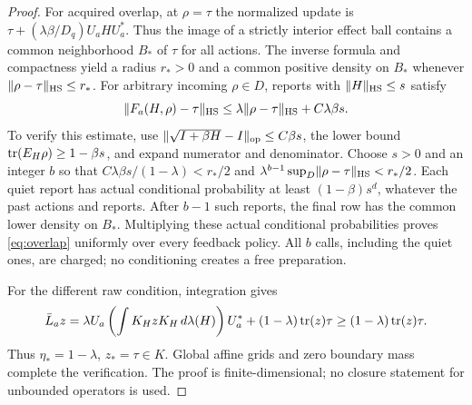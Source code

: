 \begin{proof}
For acquired overlap, at $\rho=\tau$ the normalized update is
$\tau+(\lambda\beta/D_q)U_aHU_a^*$. Thus the image of a strictly interior effect ball contains a common neighborhood $B_*$ of $\tau$ for all actions. The inverse formula and compactness yield a radius $r_*>0$ and a common positive density on $B_*$ whenever $\lVert\rho-\tau\rVert_{\mathrm{HS}}\le r_*$. For arbitrary incoming $\rho\in D$, reports with $\lVert H\rVert_{\mathrm{HS}}\le s$ satisfy
\[
 \lVert F_a(H,\rho)-\tau\rVert_{\mathrm{HS}}
 \le\lambda\lVert\rho-\tau\rVert_{\mathrm{HS}}+C\lambda\beta s.
\]
To verify this estimate, use $\lVert\sqrt{I+\beta H}-I\rVert_{\rm op}\le C\beta s$, the lower bound $\operatorname{tr}(E_H\rho)\ge1-\beta s$, and expand numerator and denominator. Choose $s>0$ and an integer $b$ so that $C\lambda\beta s/(1-\lambda)<r_*/2$ and $\lambda^{b-1}\sup_D\lVert\rho-\tau\rVert_{\mathrm{HS}}<r_*/2$. Each quiet report has actual conditional probability at least $(1-\beta)s^d$, whatever the past actions and reports. After $b-1$ such reports, the final row has the common lower density on $B_*$. Multiplying these actual conditional probabilities proves \eqref{eq:overlap} uniformly over every feedback policy. All $b$ calls, including the quiet ones, are charged; no conditioning creates a free preparation.

For the different raw condition, integration gives
\[
 \bar L_a z=\lambda U_a\left(\int K_H zK_H\,d\lambda(H)\right)U_a^*
              +(1-\lambda)\operatorname{tr}(z)\tau
 \ge (1-\lambda)\operatorname{tr}(z)\tau.
\]
Thus $\eta_*=1-\lambda$, $z_*=\tau\in K$. Global affine grids and zero boundary mass complete the verification. The proof is finite-dimensional; no closure statement for unbounded operators is used.
\end{proof}
